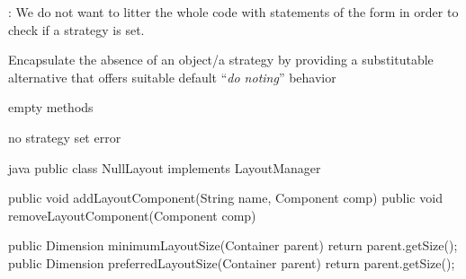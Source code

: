 \begin{intentbox}[Intent]
  : We do not want to litter the whole code with statements of
  the form  in order to check if a strategy is set.
  \begin{itemizenosep}
  \item
  Encapsulate the absence of an object/a strategy by providing a substitutable
  alternative that offers suitable default ``\textit{do noting}'' behavior
  \begin{itemizenosep}
      \item empty methods \javainline{{}}
      \item no strategy set error
  \end{itemizenosep}
  \end{itemizenosep}
\end{intentbox}
\begin{codeboxNl}{java}
public class NullLayout implements LayoutManager {
  public void addLayoutComponent(String name, Component comp) { }
  public void removeLayoutComponent(Component comp) { }

  public Dimension minimumLayoutSize(Container parent) {
    return parent.getSize();
  }
  public Dimension preferredLayoutSize(Container parent) {
    return parent.getSize();
  }
}
\end{codeboxNl}
